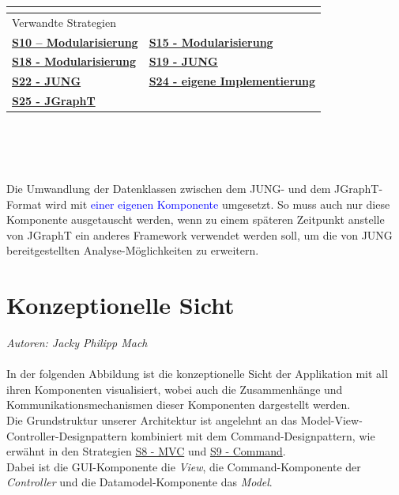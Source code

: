 \documentclass[enabledeprecatedfontcommands,fontsize=11pt,paper=a4,twoside]{scrartcl}
\newcounter{one}
\newcommand{\cb}[1]{{\textcolor{blue}{#1}}}
\begin{document}
\begin{tabular} {|p{8cm} p{8cm}|}
{{		} }\\ \hline
		\multicolumn{2}{|l|}{Verwandte Strategien} \\
		\textbf {\hyperlink{aadd}{S10 – Modularisierung}} &
		\textbf{\hyperlink{aabb}{S15 - Modularisierung}} \\
		\textbf{\hyperlink{aacc}{S18 - Modularisierung}} &
		\textbf{\hyperlink{eee}{S19 - JUNG}} \\
		\textbf{\hyperlink{fff}{S22 - JUNG}} &
		\textbf{\hyperlink{eigeneImplementierung}{S24 - eigene Implementierung}} \\
		\textbf{\hyperlink{xxx}{S25 - JGraphT}} &
		\\\hline
	\end{tabular}\\ \\ \\
	\begin{onehalfspace}
		Die Umwandlung der Datenklassen zwischen dem JUNG- und dem JGraphT-Format wird mit \cb{einer eigenen Komponente} umgesetzt. So muss auch nur diese Komponente ausgetauscht werden, wenn zu einem späteren Zeitpunkt anstelle von JGraphT ein anderes Framework verwendet werden soll, um die von JUNG bereitgestellten Analyse-Möglichkeiten zu erweitern.
	\end{onehalfspace}
	
	
	
	
	\newpage
	
	\section{Konzeptionelle Sicht}
	\label{sec:konzeptionell}
	\emph{Autoren: Jacky Philipp Mach}\\ \\
	
	In der folgenden Abbildung ist die konzeptionelle Sicht der Applikation mit all ihren Komponenten visualisiert, wobei auch die Zusammenhänge und Kommunikationsmechanismen dieser Komponenten dargestellt werden.\\
	Die Grundstruktur unserer Architektur ist angelehnt an das Model-View-Controller-Designpattern kombiniert mit dem Command-Designpattern, wie erwähnt in den Strategien \hyperlink{bbb}{S8 - MVC} und \hyperlink{command}{S9 - Command}. \\
	Dabei ist die GUI-Komponente die \textit{View}, die Command-Komponente der \textit{Controller} und die Datamodel-Komponente das \textit{Model}. \\ 
	
\end{document}
